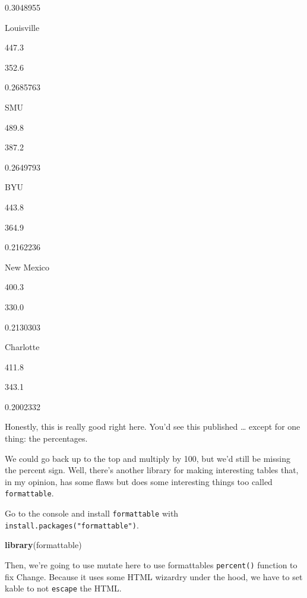 \documentclass[
]{book}
\newenvironment{Shaded}{\begin{snugshade}}{\end{snugshade}}
\newcommand{\DataTypeTok}[1]{\textcolor[rgb]{0.13,0.29,0.53}{#1}}
\newcommand{\DecValTok}[1]{\textcolor[rgb]{0.00,0.00,0.81}{#1}}
\newcommand{\KeywordTok}[1]{\textcolor[rgb]{0.13,0.29,0.53}{\textbf{#1}}}
\newcommand{\NormalTok}[1]{#1}
\newcommand{\OperatorTok}[1]{\textcolor[rgb]{0.81,0.36,0.00}{\textbf{#1}}}
\newcommand{\StringTok}[1]{\textcolor[rgb]{0.31,0.60,0.02}{#1}}
\begin{document}
0.3048955

Louisville

447.3

352.6

0.2685763

SMU

489.8

387.2

0.2649793

BYU

443.8

364.9

0.2162236

New Mexico

400.3

330.0

0.2130303

Charlotte

411.8

343.1

0.2002332

Honestly, this is really good right here. You'd see this published \ldots{} except for one thing: the percentages.

We could go back up to the top and multiply by 100, but we'd still be missing the percent sign. Well, there's another library for making interesting tables that, in my opinion, has some flaws but does some interesting things too called \texttt{formattable}.

Go to the console and install \texttt{formattable} with \texttt{install.packages("formattable")}.

\begin{Shaded}
\begin{Highlighting}[]
\KeywordTok{library}\NormalTok{(formattable)}
\end{Highlighting}
\end{Shaded}

Then, we're going to use mutate here to use formattables \texttt{percent()} function to fix Change. Because it uses some HTML wizardry under the hood, we have to set kable to not \texttt{escape} the HTML.

\begin{Shaded}
\end{Shaded}
\end{document}
